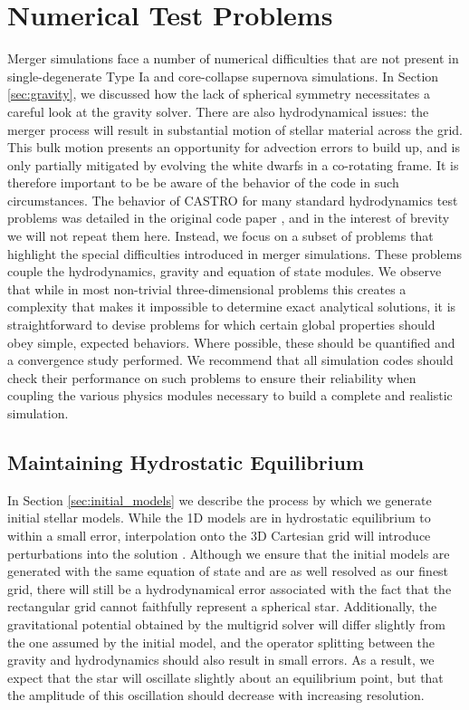 \documentclass{emulateapj}
\begin{document}
\section{Numerical Test Problems}\label{sec:Tests}

Merger simulations face a number of numerical difficulties that are
not present in single-degenerate Type Ia and core-collapse supernova
simulations. In Section \ref{sec:gravity}, we discussed how the lack
of spherical symmetry necessitates a careful look at the gravity
solver. There are also hydrodynamical issues: the merger process will
result in substantial motion of stellar material across the grid. This
bulk motion presents an opportunity for advection errors to build up,
and is only partially mitigated by evolving the white dwarfs in a
co-rotating frame. It is therefore important to be be aware of the
behavior of the code in such circumstances. The behavior of CASTRO for
many standard hydrodynamics test problems was detailed in the original
code paper \citep{castro}, and in the interest of brevity we will not
repeat them here. Instead, we focus on a subset of problems that
highlight the special difficulties introduced in merger
simulations. These problems couple the hydrodynamics, gravity and
equation of state modules. We observe that while in most non-trivial
three-dimensional problems this creates a complexity that makes it
impossible to determine exact analytical solutions, it is
straightforward to devise problems for which certain global properties
should obey simple, expected behaviors. Where possible, these should
be quantified and a convergence study performed. We recommend that all
simulation codes should check their performance on such problems to
ensure their reliability when coupling the various physics modules
necessary to build a complete and realistic simulation.

\subsection{Maintaining Hydrostatic Equilibrium}\label{sec:HSE}

In Section \ref{sec:initial_models} we describe the process by which
we generate initial stellar models. While the 1D models are in
hydrostatic equilibrium to within a small error, interpolation onto
the 3D Cartesian grid will introduce perturbations into the solution
\citep{zingale:2002}. Although we ensure that the initial models are
generated with the same equation of state and are as well resolved as
our finest grid, there will still be a hydrodynamical error associated
with the fact that the rectangular grid cannot faithfully represent a
spherical star. Additionally, the gravitational potential obtained by
the multigrid solver will differ slightly from the one assumed by the
initial model, and the operator splitting between the gravity and
hydrodynamics should also result in small errors. As a result, we
expect that the star will oscillate slightly about an equilibrium
point, but that the amplitude of this oscillation should decrease with
increasing resolution.
\end{document}
